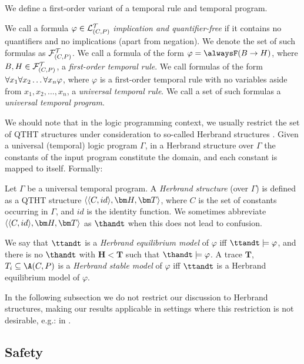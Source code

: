 We define a first-order variant of a temporal rule and temporal program.

\begin{definition}
  We call a formula $\varphi \in \mathcal{L}_{(C,P)}^\mathcal{T}$ \emph{implication and
    quantifier-free} if it contains no quantifiers and no implications
  (apart from negation). We denote the set of such formulas as
  $\mathcal{F}_{(C,P)}^\mathcal{T}$. We call a formula of the form $\varphi=\tempruleshort$,
  where $B, H \in \mathcal{F}_{(C,P)}^\mathcal{T}$, a \emph{first-order temporal rule}. We
  call formulas of the form $\forall x_1 \forall x_2 \dots \forall x_n \varphi$, where $\varphi$ is a
  first-order temporal rule with no variables aside from
  $x_1, x_2, \dots, x_n$, a \emph{universal temporal rule}. We call a
  set of such formulas a \emph{universal temporal program}.
\end{definition}

We should note that in the logic programming context, we usually
restrict the set of QTHT structures under consideration to so-called
Herbrand structures \cite{peaval06a}. Given a universal (temporal)
logic program $\Gamma$, in a Herbrand structure over $\Gamma$ the
constants of the input program constitute the domain, and each
constant is mapped to itself. Formally:

\begin{definition}
  Let $\Gamma$ be a universal temporal program. A \emph{Herbrand
    structure} (over $\Gamma$) is defined as a QTHT structure
  $\herbrandhandt$, where $C$ is the set of constants occurring in
  $\Gamma$, and $id$ is the identity function. We sometimes abbreviate
  $\herbrandhandt$ as $\thandt$ when this does not lead to confusion.

  We say that $\ttandt$ is a \emph{Herbrand equilibrium model} of
  $\varphi$ iff $\ttandt \models \varphi$, and there is no $\thandt$
  with $\bm{H} < \bm{T}$ such that $\thandt \models \varphi$. A trace
  $\bm{T}$, $T_i \subseteq \A(C,P)$ is a \emph{Herbrand stable model}
  of $\varphi$ iff $\ttandt$ is a Herbrand equilibrium model of
  $\varphi$.

\end{definition}

In the following subsection we do not restrict our discussion to
Herbrand structures, making our results applicable in settings where
this restriction is not desirable, e.g.: in \cite{henive08a}.

\subsection{Safety}

